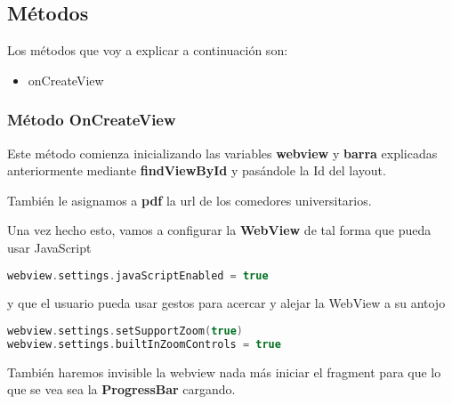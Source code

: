 \subsection{Métodos}

\vspace{5 mm}

Los métodos que voy a explicar a continuación son:

\begin{itemize}
\item{onCreateView}
\end{itemize}

\vspace{5 mm}

\subsubsection{Método OnCreateView}

\vspace{5 mm}

Este método comienza inicializando las variables \textbf{webview} y \textbf{barra} explicadas anteriormente mediante \textbf{findViewById} y pasándole la Id del layout.

También le asignamos a \textbf{pdf} la url de los comedores universitarios.

\vspace{5 mm}

Una vez hecho esto, vamos a configurar la \textbf{WebView} de tal forma que pueda usar JavaScript

\vspace{5 mm}


\begin{lstlisting}[language=Kotlin]
webview.settings.javaScriptEnabled = true
\end{lstlisting}

\vspace{5 mm}


y que el usuario pueda usar gestos para acercar y alejar la WebView a su antojo

\vspace{5 mm}


\begin{lstlisting}[language=Kotlin]
webview.settings.setSupportZoom(true)
webview.settings.builtInZoomControls = true
\end{lstlisting}

\vspace{5 mm}

También haremos invisible la webview nada más iniciar el fragment para que lo que se vea sea la \textbf{ProgressBar} cargando.

